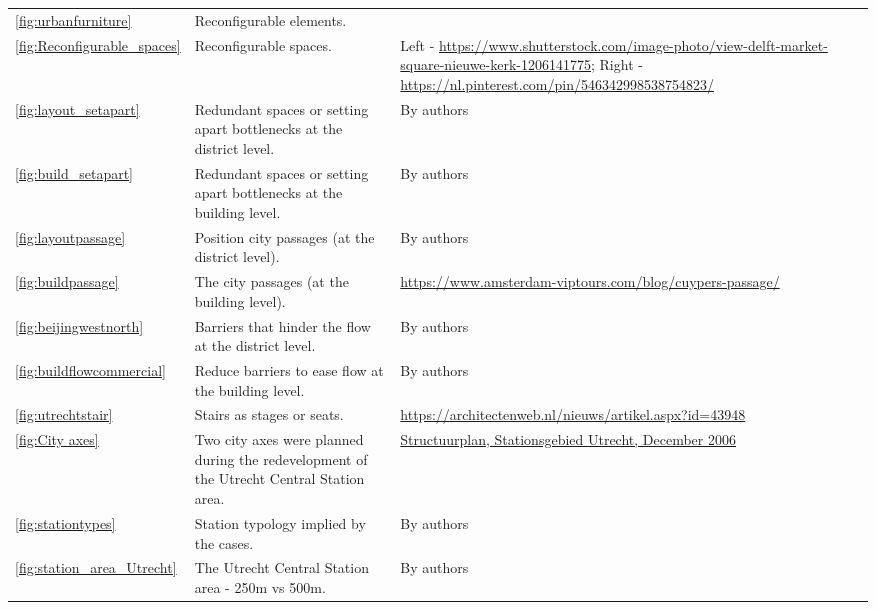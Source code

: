 \documentclass[]{article}
\begin{document}
\begin{xltabular}{\textwidth}{p{0.01\textwidth} p{0.42\textwidth} p{0.50\textwidth}}
\ref{fig:urbanfurniture} & Reconfigurable elements. & \citep{iversStagingUrbanLandscapes2018} \\

\ref{fig:Reconfigurable_spaces} & Reconfigurable spaces. & Left - \url{https://www.shutterstock.com/image-photo/view-delft-market-square-nieuwe-kerk-1206141775}; Right - \url{https://nl.pinterest.com/pin/546342998538754823/} \\

\ref{fig:layout_setapart} & Redundant spaces or setting apart bottlenecks at the district level. & By authors \\

\ref{fig:build_setapart} & Redundant spaces or setting apart bottlenecks at the building level. & By authors \\

\ref{fig:layoutpassage} & Position city passages (at the district level). & By authors \\

\ref{fig:buildpassage} & The city passages (at the building level). & \url{https://www.amsterdam-viptours.com/blog/cuypers-passage/} \\

\ref{fig:beijingwestnorth} & Barriers that hinder the flow at the district level. & By authors \\

\ref{fig:buildflowcommercial} & Reduce barriers to ease flow at the building level. & By authors \\

\ref{fig:utrechtstair} & Stairs as stages or seats. & \url{https://architectenweb.nl/nieuws/artikel.aspx?id=43948} \\

\ref{fig:City axes} & Two city axes were planned during the redevelopment of the Utrecht Central Station area. & \href{https://www.bouwpututrecht.nl/wp-content/uploads/2015/12/12A-OO-Structuurplan-Stationsgebied-2006.pdf}{Structuurplan, Stationsgebied Utrecht, December 2006} \\

\ref{fig:stationtypes} & Station typology implied by the cases. & By authors \\








\ref{fig:station_area_Utrecht} & The Utrecht Central Station area - 250m vs 500m. & By authors \\


\end{xltabular}
\end{document}
